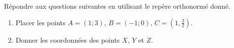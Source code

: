 
\begin{exercice}\label{exoSeconde-0002}

    \begin{center}
   
    \end{center}
    Répondre aux questions suivantes en utilisant le repère orthonormé donné.
    \begin{enumerate}
        \item
            Placer les points \( A=(1;3)\), \( B=(-1;0)\), \( C=(1,\frac{ 3 }{2})\).
        \item
            Donner les coordonnées des points \( X\), \( Y\) et \( Z\).
    \end{enumerate}
    \vspace{1cm}

\end{exercice}
